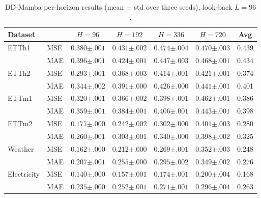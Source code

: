 \documentclass[runningheads]{llncs}
\newcommand{\model}{DD-Mamba}
\begin{document}
\begin{table}[tb]
\centering
\caption{\model{} per-horizon results (mean $\pm$ std over three
seeds), look-back $L{=}96$.}
\label{tab:horizons}
\scriptsize
\setlength{\tabcolsep}{3.0pt}
\begin{tabular}{@{}llccccc@{}}
\toprule
Dataset & & $H{=}96$ & $H{=}192$ & $H{=}336$ & $H{=}720$ & Avg \\
\midrule
ETTh1 & MSE & $0.380{\scriptstyle\pm.001}$ & $0.431{\scriptstyle\pm.002}$ & $0.474{\scriptstyle\pm.004}$ & $0.470{\scriptstyle\pm.003}$ & 0.439 \\
 & MAE & $0.396{\scriptstyle\pm.001}$ & $0.424{\scriptstyle\pm.001}$ & $0.447{\scriptstyle\pm.003}$ & $0.468{\scriptstyle\pm.001}$ & 0.434 \\
ETTh2 & MSE & $0.293{\scriptstyle\pm.001}$ & $0.368{\scriptstyle\pm.003}$ & $0.414{\scriptstyle\pm.001}$ & $0.421{\scriptstyle\pm.001}$ & 0.374 \\
 & MAE & $0.344{\scriptstyle\pm.002}$ & $0.391{\scriptstyle\pm.000}$ & $0.426{\scriptstyle\pm.000}$ & $0.441{\scriptstyle\pm.001}$ & 0.401 \\
ETTm1 & MSE & $0.320{\scriptstyle\pm.001}$ & $0.366{\scriptstyle\pm.002}$ & $0.398{\scriptstyle\pm.001}$ & $0.462{\scriptstyle\pm.001}$ & 0.386 \\
 & MAE & $0.359{\scriptstyle\pm.001}$ & $0.384{\scriptstyle\pm.001}$ & $0.406{\scriptstyle\pm.001}$ & $0.443{\scriptstyle\pm.001}$ & 0.398 \\
ETTm2 & MSE & $0.177{\scriptstyle\pm.000}$ & $0.242{\scriptstyle\pm.002}$ & $0.302{\scriptstyle\pm.000}$ & $0.401{\scriptstyle\pm.003}$ & 0.280 \\
 & MAE & $0.260{\scriptstyle\pm.001}$ & $0.303{\scriptstyle\pm.001}$ & $0.340{\scriptstyle\pm.000}$ & $0.398{\scriptstyle\pm.002}$ & 0.325 \\
Weather & MSE & $0.162{\scriptstyle\pm.000}$ & $0.212{\scriptstyle\pm.000}$ & $0.269{\scriptstyle\pm.001}$ & $0.352{\scriptstyle\pm.003}$ & 0.248 \\
 & MAE & $0.207{\scriptstyle\pm.001}$ & $0.255{\scriptstyle\pm.000}$ & $0.295{\scriptstyle\pm.002}$ & $0.349{\scriptstyle\pm.002}$ & 0.276 \\
Electricity & MSE & $0.140{\scriptstyle\pm.000}$ & $0.157{\scriptstyle\pm.001}$ & $0.174{\scriptstyle\pm.001}$ & $0.200{\scriptstyle\pm.004}$ & 0.168 \\
 & MAE & $0.235{\scriptstyle\pm.000}$ & $0.252{\scriptstyle\pm.001}$ & $0.271{\scriptstyle\pm.001}$ & $0.296{\scriptstyle\pm.004}$ & 0.263 \\

\end{tabular}
\end{table}
\end{document}
